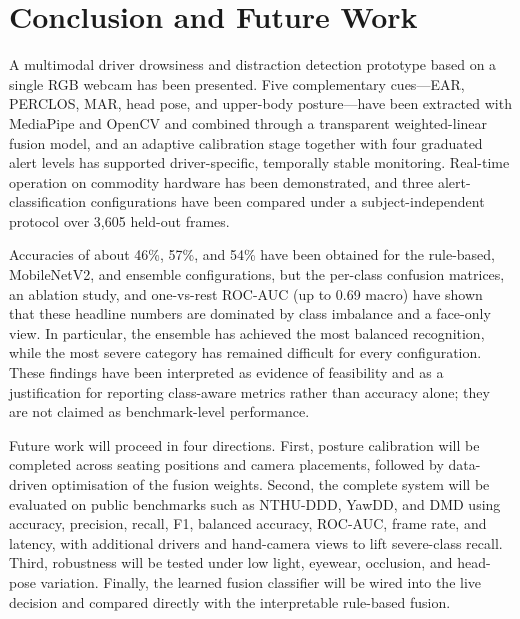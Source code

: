 \documentclass[conference]{IEEEtran}
\begin{document}
\section{Conclusion and Future Work}
A multimodal driver drowsiness and distraction detection prototype based on a single RGB webcam has been presented. Five complementary cues---EAR, PERCLOS, MAR, head pose, and upper-body posture---have been extracted with MediaPipe and OpenCV and combined through a transparent weighted-linear fusion model, and an adaptive calibration stage together with four graduated alert levels has supported driver-specific, temporally stable monitoring. Real-time operation on commodity hardware has been demonstrated, and three alert-classification configurations have been compared under a subject-independent protocol over 3{,}605 held-out frames.

Accuracies of about 46\%, 57\%, and 54\% have been obtained for the rule-based, MobileNetV2, and ensemble configurations, but the per-class confusion matrices, an ablation study, and one-vs-rest ROC-AUC (up to 0.69 macro) have shown that these headline numbers are dominated by class imbalance and a face-only view. In particular, the ensemble has achieved the most balanced recognition, while the most severe category has remained difficult for every configuration. These findings have been interpreted as evidence of feasibility and as a justification for reporting class-aware metrics rather than accuracy alone; they are not claimed as benchmark-level performance.

Future work will proceed in four directions. First, posture calibration will be completed across seating positions and camera placements, followed by data-driven optimisation of the fusion weights. Second, the complete system will be evaluated on public benchmarks such as NTHU-DDD, YawDD, and DMD using accuracy, precision, recall, F1, balanced accuracy, ROC-AUC, frame rate, and latency, with additional drivers and hand-camera views to lift severe-class recall. Third, robustness will be tested under low light, eyewear, occlusion, and head-pose variation. Finally, the learned fusion classifier will be wired into the live decision and compared directly with the interpretable rule-based fusion.
\end{document}
